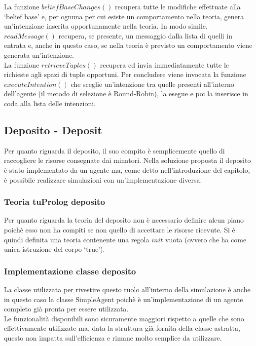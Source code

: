 La funzione $beliefBaseChanges()$ recupera tutte le modifiche effettuate alla `belief base' e, per ognuna per cui esiste un comportamento nella teoria, genera un'intenzione inserita opportunamente nella teoria. In modo simile, $readMessage()$ recupera, se presente, un messaggio dalla lista di quelli in entrata e, anche in questo caso, se nella teoria è previsto un comportamento viene generata un'intenzione.
\\
La funzione $retrieveTuples()$ recupera ed invia immediatamente tutte le richieste agli spazi di tuple opportuni.
Per concludere viene invocata la funzione $executeIntention()$ che sceglie un'intenzione tra quelle presenti all'interno dell'agente (il metodo di selezione è Round-Robin), la esegue e poi la inserisce in coda alla lista delle intenzioni.

\subsection{Deposito - Deposit}
Per quanto riguarda il deposito, il suo compito è semplicemente quello di raccogliere le risorse consegnate dai minatori.
Nella soluzione proposta il deposito è stato implementato da un agente ma, come detto nell'introduzione del capitolo, è possibile realizzare simulazioni con un'implementazione diversa.

\subsubsection{Teoria tuProlog deposito}
Per quanto riguarda la teoria del deposito non è necessario definire alcun piano poichè esso non ha compiti se non quello di accettare le risorse ricevute. Si è quindi definita una teoria contenente una regola $init$ vuota (ovvero che ha come unica istruzione del corpo `true').

\subsubsection{Implementazione classe deposito}
La classe utilizzata per rivestire questo ruolo all'interno della simulazione è anche in questo caso la classe SimpleAgent poichè è un'implementazione di un agente completo già pronta per essere utilizzata.
\\
Le funzionalità disponibili sono sicuramente maggiori rispetto a quelle che sono effettivamente utilizzate ma, data la struttura già fornita della classe astratta, questo non impatta sull'efficienza e rimane molto semplice da utilizzare.

